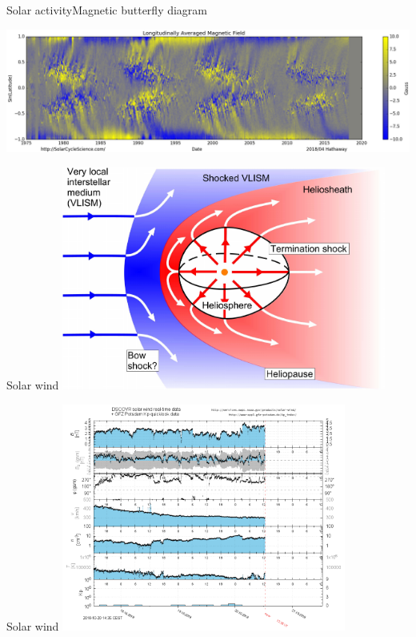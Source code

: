 \begin{frame}[c,label=butterfly]{Solar activity}{Magnetic butterfly diagram}
	
	\centering
	\includegraphics[width=\textwidth]{../figures_of_others/images/Hathaway_magbfly_201804_cropped.png}
\end{frame}
\begin{frame}[plain,c]{Solar wind}{}
	\centering
	\includegraphics[width=0.8\textwidth]{../figures_of_others/images/Owens2013_Heliosphere_screenshot.png}
\end{frame}
\begin{frame}[plain,c]{Solar wind}{}
	\centering
	\includegraphics[width=0.7\textwidth]{../talk_figures/ace_realtime_ap_plot.png}
\end{frame}
